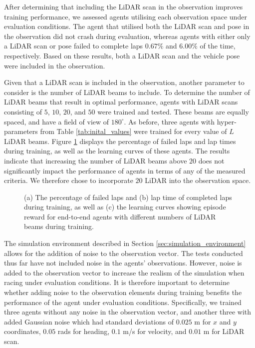 After determining that including the LiDAR scan in the observation improves training performance, we assessed agents utilising each observation space under evaluation conditions.
The agent that utilised both the LiDAR scan and pose in the observation did not crash during evaluation, whereas agents with either only a LiDAR scan or pose failed to complete laps $0.67\%$ and $6.00\%$ of the time, respectively.
Based on these results, both a LiDAR scan and the vehicle pose were included in the observation.


Given that a LiDAR scan is included in the observation, another parameter to consider is the number of LiDAR beams to include.
To determine the number of LiDAR beams that result in optimal performance, agents with LiDAR scans consisting of $5$, $10$, $20$, and $50$ were trained and tested.
These beams are equally spaced, and have a field of view of $180^{\circ}$.
As before, three agents with hyper-parameters from Table \ref{tab:inital_values} were trained for every value of $L$ LiDAR beams.
Figure \ref{fig:n_beams} displays the percentage of failed laps and lap times during training, as well as the learning curves of these agents.
The results indicate that increasing the number of LiDAR beams above $20$ does not significantly impact the performance of agents in terms of any of the measured criteria. 
We therefore chose to incorporate $20$ LiDAR into the observation space.

\begin{figure}[htb!]
    \centering
    
    \caption[Learning curves of agents with different numbers of LiDAR beams during training]{(a) The percentage of failed laps and (b) lap time of completed laps during training, as well as (c) the learning curves showing episode reward for end-to-end agents with different numbers of LiDAR beams during training.}
    \label{fig:n_beams}
\end{figure}

The simulation environment described in Section \ref{sec:simulation_environment} allows for the addition of noise to the observation vector.
The tests conducted thus far have not included noise in the agents' observations.
However, noise is added to the observation vector to increase the realism of the simulation when racing under evaluation conditions.
It is therefore important to determine whether adding noise to the observation elements during training benefits the performance of the agent under evaluation conditions.
Specifically, we trained three agents without any noise in the observation vector, and another three with added Gaussian noise which had standard deviations of $0.025$ m for $x$ and $y$ coordinates, $0.05$ rads for heading, $0.1$ m/s for velocity, and $0.01$ m for LiDAR scan.

